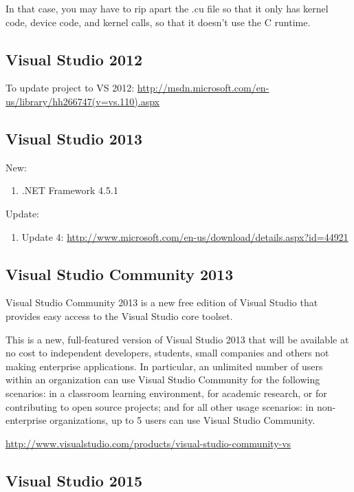 In that case, you may have to rip apart the .cu file so that
it only has kernel code, device code, and kernel calls, so that it doesn't use
the C runtime. 




\subsection{Visual Studio 2012}

To update project to VS 2012:
\url{http://msdn.microsoft.com/en-us/library/hh266747(v=vs.110).aspx}



\subsection{Visual Studio 2013}


New:
\begin{enumerate}
  \item .NET Framework 4.5.1
\end{enumerate}

Update:
\begin{enumerate}
  \item Update 4:
  \url{http://www.microsoft.com/en-us/download/details.aspx?id=44921}
\end{enumerate}

\subsection{Visual Studio Community 2013}

Visual Studio Community 2013 is a new free edition of Visual Studio that
provides easy access to the Visual Studio core toolset. 

This is a new, full-featured version of Visual Studio 2013 that will be
available at no cost to independent developers, students, small companies and
others not making enterprise applications.  In particular, an unlimited number
of users within an organization can use Visual Studio Community for the
following scenarios: in a classroom learning environment, for academic research,
or for contributing to open source projects; and for all other usage scenarios:
in non-enterprise organizations, up to 5 users can use Visual Studio Community.

\url{http://www.visualstudio.com/products/visual-studio-community-vs}


\subsection{Visual Studio 2015}

